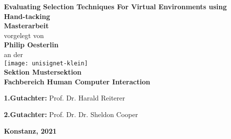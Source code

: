 \documentclass{article}
\begin{document}
\begin{titlepage}
    \begin{center}
    {\LARGE \textbf{Evaluating Selection Techniques For Virtual Environments using Hand-tacking}}
    \\[1cm]
    {\Large \textbf{Masterarbeit}}
    \\[1cm]
    {\Large vorgelegt von}
    \\[0.5cm]
    {\LARGE \textbf{Philip Oesterlin}}
    \\[0.5cm]
    {\Large an der}
    \\[0.5cm]
    \texttt{[image: unisignet-klein]}
    \\[1cm]
    {\Large \textbf{Sektion Mustersektion}}
    \\[1cm]
    {\Large \textbf{Fachbereich Human Computer Interaction}}
    \\[2cm]
    \begin{minipage}[c]{0.8\textwidth}
    \begin{description}[style=multiline]
     \item {\Large \textbf{1.Gutachter:} Prof. Dr. Harald Reiterer }
     \item {\Large \textbf{2.Gutachter:} Prof. Dr. Dr. Sheldon Cooper}
    \end{description}
    \end{minipage}
    \vfill
    {\LARGE \textbf{Konstanz, 2021}}
    \end{center}
\end{titlepage}





\end{document}
